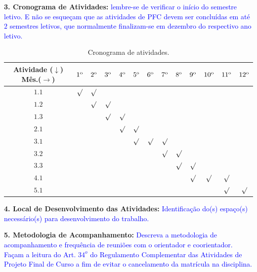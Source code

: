 \documentclass[oneside,a4paper,11pt]{article}
\newcommand{\orientacao}[1]{{\textcolor{blue}{#1}}}
\begin{document}
\vspace{.5cm}
\noindent\textbf{3. Cronograma de Atividades:} \orientacao{lembre-se de verificar o início do semestre letivo. E não se esqueçam que as atividades de PFC devem ser concluídas em até $2$ semestres letivos, que normalmente finalizam-se em dezembro do respectivo ano letivo.}

\begin{table}[!ht]
\begin{center}
{\footnotesize{\begin{tabular}{c|c|c|c|c|c|c|c|c|c|c|c|c} \hline \hline
Atividade ($\downarrow$) Mês.($\rightarrow$) & $1^{\mbox{\scriptsize o}}$  & $2^{\mbox{\scriptsize o}}$  &$3^{\mbox{\scriptsize o}}$
&$4^{\mbox{\scriptsize o}}$ &$5^{\mbox{\scriptsize o}}$ &$6^{\mbox{\scriptsize o}}$ &$7^{\mbox{\scriptsize o}}$
&$8^{\mbox{\scriptsize o}}$ &$9^{\mbox{\scriptsize o}}$ &$10^{\mbox{\scriptsize o}}$ &$11^{\mbox{\scriptsize o}}$
&$12^{\mbox{\scriptsize o}}$\\ \hline
$1.1$ & $\surd$ & $\surd$ & & & & & & & & & & \\ \hline
$1.2$ & &$\surd$& $\surd$ & & & & & & & & & \\ \hline
$1.3$ & & & $\surd$ & $\surd$ & & & & & & & & \\ \hline
$2.1$ & & & & $\surd$ & $\surd$ & & & & & & & \\ \hline
$3.1$ &  &  & & & $\surd$ &$\surd$ & $\surd$ & & & & & \\ \hline
$3.2$ &  &  & & & & &$\surd$&$\surd$ & & & & \\ \hline
$3.3$ & & & & & & & & $\surd$ & $\surd$ & & & \\ \hline
$4.1$ & & & & & & & & & $\surd$& $\surd$ & $\surd$ & \\ \hline
$5.1$ & & & & & & & & & & & $\surd$ & $\surd$ \\ \hline\hline
\end{tabular}}}
\caption{Cronograma de atividades. \label{tab:1}}
\end{center}
\end{table}

\vspace{.5cm}
\noindent\textbf{4. Local de Desenvolvimento das Atividades:}
\orientacao{Identificação do(s) espaço(s) necessário(s) para desenvolvimento do trabalho.}

\vspace{.5cm}
\noindent\textbf{5. Metodologia de Acompanhamento:}
\orientacao{Descreva a metodologia de acompanhamento e frequência de reuniões com o orientador e coorientador. Façam a leitura do Art. $34^o$ do Regulamento Complementar das Atividades de Projeto Final de Curso a fim de evitar o cancelamento da matrícula na disciplina.}

\newpage  

\end{document}
